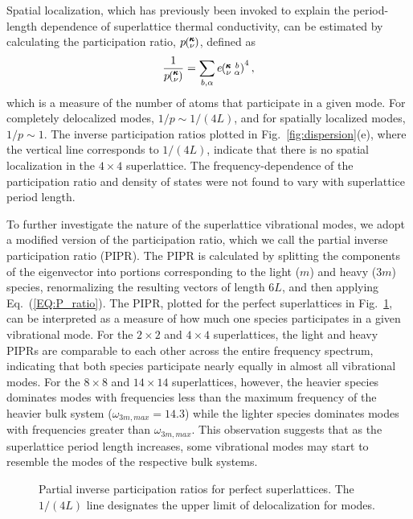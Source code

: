\documentclass[aps,prb,preprint,preprintnumbers,amsmath,amssymb,floatfix,superscriptaddress]{revtex4}
\newcommand{\kvba}{\mspace{-4.0mu}\left(\mspace{-8.0mu}
\begin{smallmatrix} &\pmb{\kappa} &b \\ &\nu &\alpha\end{smallmatrix}
\mspace{-3.0mu}\right)}
\newcommand{\kv}{\mspace{-4.0mu}\left(\mspace{-8.0mu}
\begin{smallmatrix}&\pmb{\kappa} \\&\nu\end{smallmatrix}
\mspace{-3.0mu}\right)}
\begin{document}
Spatial localization, which has previously been invoked to explain the period-length dependence of superlattice thermal conductivity, \cite{PhysRevB.61.3091} can be estimated by calculating the participation ratio, $p\kv$, defined as\cite{PhysRevB.70.235214}
\begin{equation}\label{EQ:P_ratio}
\begin{split}
\frac{1}{p\kv}=\sum_{b,\alpha}e\kvba^4,
\end{split}
\end{equation}
which is a measure of the number of atoms that participate in a given mode. For completely delocalized modes, $1/p\sim 1/(4L)$, and for spatially localized modes, $1/p\sim 1$.\cite{PhysRevB.70.235214} The inverse participation ratios plotted in Fig.~\ref{fig:dispersion}(e), where the vertical line corresponds to $1/(4L)$, indicate that there is no spatial localization in the $4\times4$ superlattice. The frequency-dependence of the participation ratio and density of states were not found to vary with superlattice period length.

To further investigate the nature of the superlattice vibrational modes, we adopt a modified version of the participation ratio, which we call the partial inverse participation ratio (PIPR). The PIPR is calculated by splitting the components of the eigenvector into portions corresponding to the light ($m$) and heavy ($3m$) species, renormalizing the resulting vectors of length $6L$, and then applying Eq.~(\ref{EQ:P_ratio}). The PIPR, plotted for the perfect superlattices in Fig.~\ref{FIG:ipnum}, can be interpreted as a measure of how much one species participates in a given vibrational mode. For the $2 \times 2$ and $4 \times 4$ superlattices, the light and heavy PIPRs are comparable to each other across the entire frequency spectrum, indicating that both species participate nearly equally in almost all vibrational modes. For the $8 \times 8$ and $14 \times 14$ superlattices, however, the heavier species dominates modes with frequencies less than the maximum frequency of the heavier bulk system ($\omega_{3m,max}=14.3$) while the lighter species dominates modes with frequencies greater than $\omega_{3m,max}$. This observation suggests that as the superlattice period length increases, some vibrational modes may start to resemble the modes of the respective bulk systems. 
\begin{figure}[h!]
\begin{center}
\renewcommand{\figure}{Fig.}
\caption{Partial inverse participation ratios for perfect superlattices. The $1/(4L)$ line designates the upper limit of delocalization for modes.}
\label{FIG:ipnum}
\end{center}
\end{figure}
\end{document}
